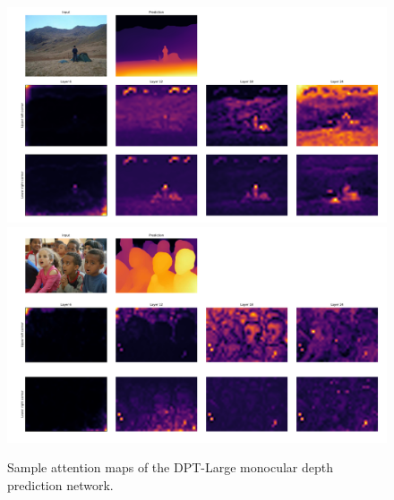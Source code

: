 \documentclass[10pt,twocolumn,letterpaper]{article}
\begin{document}
\begin{figure}[!t]
  \centering
  \includegraphics[width=1\textwidth]{images/attention_maps_large/wanderer}\\
  \includegraphics[width=1\textwidth]{images/attention_maps_large/children}
  \caption{Sample attention maps of the DPT-Large monocular depth prediction network.}
  \label{fig:attention_large}
\end{figure}
\end{document}
